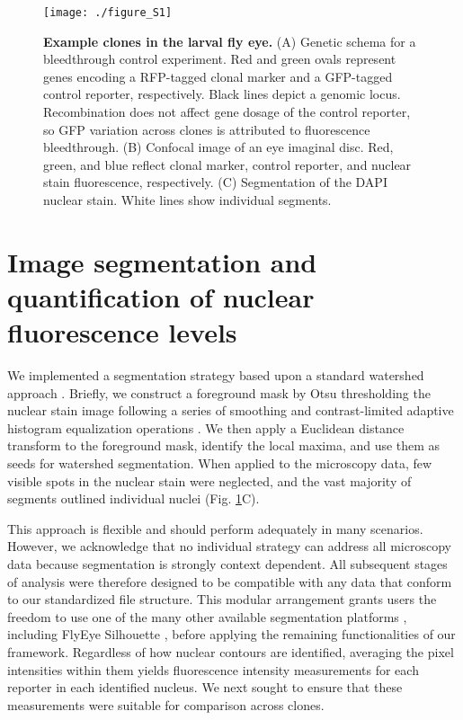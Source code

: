 \begin{figure}[h!]
\texttt{[image: ./figure\_S1]}
\caption[Example clones in the larval fly eye.]{\textbf{Example clones in the larval fly eye.} (A) Genetic schema for a bleedthrough control experiment. Red and green ovals represent genes encoding a RFP-tagged clonal marker and a GFP-tagged control reporter, respectively. Black lines depict a genomic locus. Recombination does not affect gene dosage of the control reporter, so GFP variation across clones is attributed to fluorescence bleedthrough. (B) Confocal image of an eye imaginal disc. Red, green, and blue reflect clonal marker, control reporter, and nuclear stain fluorescence, respectively. (C) Segmentation of the DAPI nuclear stain. White lines show individual segments.}
\label{fig:clones:figS1}
\end{figure}

\section{Image segmentation and quantification of nuclear fluorescence levels}
\label{ch:clones:segmentation}

We implemented a segmentation strategy based upon a standard watershed approach \cite{VanderWalt2014}. Briefly, we construct a foreground mask by Otsu thresholding the nuclear stain image following a series of smoothing and contrast-limited adaptive histogram equalization operations \cite{NobuyukiOtsu1979,VanderWalt2014}. We then apply a Euclidean distance transform to the foreground mask, identify the local maxima, and use them as seeds for watershed segmentation. When applied to the microscopy data, few visible spots in the nuclear stain were neglected, and the vast majority of segments outlined individual nuclei (Fig. \ref{fig:clones:figS1}C).

This approach is flexible and should perform adequately in many scenarios. However, we acknowledge that no individual strategy can address all microscopy data because segmentation is strongly context dependent. All subsequent stages of analysis were therefore designed to be compatible with any data that conform to our standardized file structure. This modular arrangement grants users the freedom to use one of the many other available segmentation platforms \cite{Bugarski2014}, including FlyEye Silhouette \cite{Pelaez2015a}, before applying the remaining functionalities of our framework. Regardless of how nuclear contours are identified, averaging the pixel intensities within them yields fluorescence intensity measurements for each reporter in each identified nucleus. We next sought to ensure that these measurements were suitable for comparison across clones.

